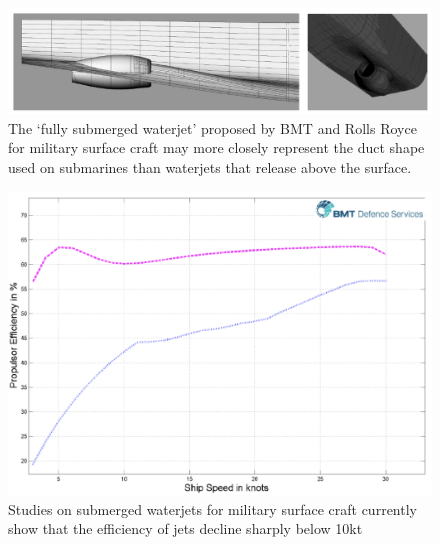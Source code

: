 \documentclass{article}\usepackage[]{graphicx}\usepackage[]{color}
\begin{document}
\begin{figure}[h]
\captionsetup{width=\textwidth}
\includegraphics[width=\textwidth]{BMTShape.png}
\caption{The `fully submerged waterjet' proposed by BMT and Rolls Royce for military surface craft may more closely represent the duct shape used on submarines than waterjets that release above the surface. \parencite{giles2010}}
\label{fig:BMTShape.png}
\end{figure}

\begin{figure}[h]
\captionsetup{width = 0.9\textwidth}
\includegraphics[width=0.8\linewidth, center]{BMTEfficiency2.png}
\caption{Studies on submerged waterjets for military surface craft currently show that the efficiency of jets decline sharply below 10kt \parencite{giles2010}}
\label{fig:BMTEfficiency.png}
\end{figure}
\end{document}
